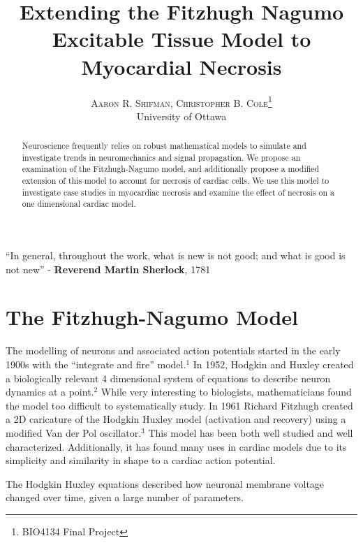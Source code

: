 \documentclass[11pt]{report}
\title{\vspace{-15mm}\fontsize{24pt}{10pt}\selectfont\textbf{Extending the Fitzhugh Nagumo Excitable Tissue Model to Myocardial Necrosis}} %
\author{
\large
\textsc{Aaron R. Shifman, Christopher B. Cole}\thanks{BIO4134 Final Project}\\[2mm] %
\normalsize University of Ottawa \\ %
\vspace{-5mm}
}
\date{}
\newenvironment{dedication}
  {\clearpage           %
   \thispagestyle{empty}%
   \vspace*{\stretch{1}}%
   \itshape             %
   \raggedleft          %
  }
  {\par %
   \vspace{\stretch{3}} %
   \clearpage           %
  }
\begin{document}
\maketitle %

\thispagestyle{fancy} %


\begin{dedication}
``In general, throughout the work, what is new is not good; and what is good is not new'' - \textbf{Reverend Martin Sherlock}, 1781 
\end{dedication}

\begin{abstract}

Neuroscience frequently relies on robust mathematical models to simulate and investigate trends in neuromechanics and signal propagation. We propose an examination of the Fitzhugh-Nagumo model, and additionally propose a modified extension of this model to account for necrosis of cardiac cells. We use this model to investigate case studies in myocardiac necrosis and examine the effect of necrosis on a one dimensional cardiac model. 
\end{abstract}


\newpage

\tableofcontents

\newpage

\listoffigures

\newpage

\chapter{The Fitzhugh-Nagumo Model}

The modelling of neurons and associated action potentials started in the early 1900s with the ``integrate and fire'' model.$^1$ In 1952, Hodgkin and Huxley created a biologically relevant 4 dimensional system of equations to describe neuron dynamics at a point.$^2$ While very interesting to biologists, mathematicians found the model too difficult to systematically study. In 1961 Richard Fitzhugh created a 2D caricature of the Hodgkin Huxley model (activation and recovery) using a modified Van der Pol oscillator.$^3$ This model has been both well studied and well characterized. Additionally, it has found many uses in cardiac models due to its simplicity and similarity in shape to a cardiac action potential. 

The Hodgkin Huxley equations described how neuronal membrane voltage changed over time, given a large number of parameters. 
\end{document}
